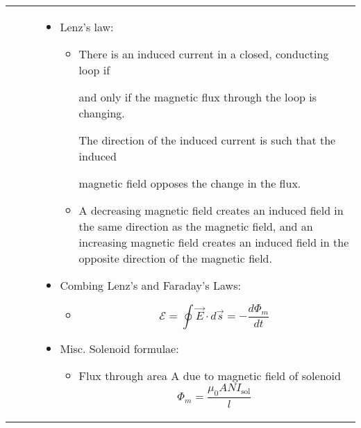 \documentclass{article}
\begin{document}
\begin{center}
\begin{longtable}{|p{9cm}|p{9cm}|}
\begin{itemize}
\begin{enumerate}
			      \end{enumerate}

		\end{itemize}





		                &



		\begin{itemize}



			\item Lenz's law:

			      \begin{itemize}

				      \item There is an induced current in a closed, conducting loop if

				            and only if the magnetic flux through the loop is changing.

				            The direction of the induced current is such that the induced

				            magnetic field opposes the change in the flux.

				      \item A decreasing magnetic field creates an induced field in the same direction as the magnetic field, and an increasing magnetic field creates an induced field in the opposite direction of the magnetic field.

			      \end{itemize}

			\item Combing Lenz's and Faraday's Laws:

			      \begin{itemize}

				      \item  \[ \mathcal{E} = \oint \vec{E} \cdot d\vec{s} = -\frac{d\Phi_m}{dt}\]

			      \end{itemize}



			\item Misc. Solenoid formulae:

			      \begin{itemize}

				      \item Flux through area A due to magnetic field of solenoid\[ \Phi_m = \frac{\mu_0 A N I_\text{sol}}{l} \]


\end{itemize}
\end{itemize}
\end{longtable}
\end{center}
\end{document}
